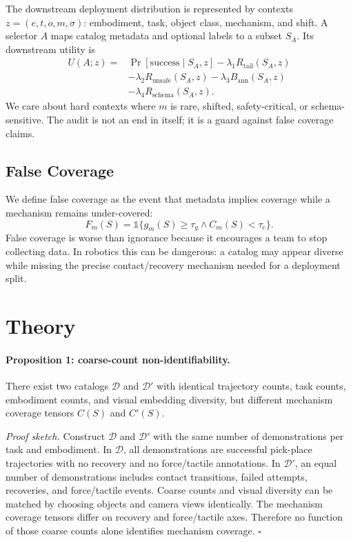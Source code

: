 \documentclass{article}
\begin{document}
The downstream deployment distribution is represented by contexts $z=(e,t,o,m,\sigma)$: embodiment, task, object class, mechanism, and shift. A selector $A$ maps catalog metadata and optional labels to a subset $S_A$. Its downstream utility is
\[
  \begin{aligned}
  U(A;z)=&\Pr[\text{success}\mid S_A,z] - \lambda_1 R_{\mathrm{tail}}(S_A,z)\\
  &-\lambda_2 R_{\mathrm{unsafe}}(S_A,z)-\lambda_3 B_{\mathrm{ann}}(S_A,z)\\
  &-\lambda_4 R_{\mathrm{schema}}(S_A,z).
  \end{aligned}
\]
We care about hard contexts where $m$ is rare, shifted, safety-critical, or schema-sensitive. The audit is not an end in itself; it is a guard against false coverage claims.

\subsection{False Coverage}
We define false coverage as the event that metadata implies coverage while a mechanism remains under-covered:
\[
  F_m(S)=\mathbb{1}\{g_m(S)\ge \tau_g \land C_m(S)<\tau_c\}.
\]
False coverage is worse than ignorance because it encourages a team to stop collecting data. In robotics this can be dangerous: a catalog may appear diverse while missing the precise contact/recovery mechanism needed for a deployment split.

\section{Theory}
\paragraph{Proposition 1: coarse-count non-identifiability.}
There exist two catalogs $\mathcal{D}$ and $\mathcal{D}'$ with identical trajectory counts, task counts, embodiment counts, and visual embedding diversity, but different mechanism coverage tensors $C(S)$ and $C'(S)$.

\textit{Proof sketch.}
Construct $\mathcal{D}$ and $\mathcal{D}'$ with the same number of demonstrations per task and embodiment. In $\mathcal{D}$, all demonstrations are successful pick-place trajectories with no recovery and no force/tactile annotations. In $\mathcal{D}'$, an equal number of demonstrations includes contact transitions, failed attempts, recoveries, and force/tactile events. Coarse counts and visual diversity can be matched by choosing objects and camera views identically. The mechanism coverage tensors differ on recovery and force/tactile axes. Therefore no function of those coarse counts alone identifies mechanism coverage. \hfill $\square$
\end{document}
